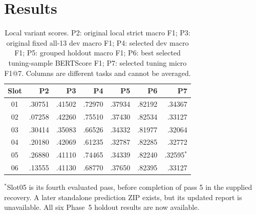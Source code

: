 \section{Results}\label{sec:results}
\begin{table}[H]
\centering\small
\caption{Local variant scores. P2: original local strict macro F1; P3: original fixed all-13 dev macro F1; P4: selected dev macro F1; P5: grouped holdout macro F1; P6: best selected tuning-sample BERTScore F1; P7: selected tuning micro F1@7. Columns are different tasks and cannot be averaged.}
\label{tab:variants}
\begin{tabular}{crrrrrr}
\toprule
Slot & P2 & P3 & P4 & P5 & P6 & P7\\
\midrule
01 & .30751 & .41502 & .72970 & .37934 & .82192 & .34367\\
02 & .07258 & .42260 & .75510 & .37430 & .82534 & .33127\\
03 & .30414 & .35083 & .66526 & .34332 & .81977 & .32064\\
04 & .20180 & .42069 & .61235 & .32787 & .82285 & .32772\\
05 & .26880 & .41110 & .74465 & .34339 & .82240 & .32595$^{*}$\\
06 & .13555 & .41130 & .68770 & .37650 & .82395 & .33127\\
\bottomrule
\end{tabular}
\end{table}
\noindent\small $^{*}$Slot05 is its fourth evaluated pass, before completion of pass 5 in the supplied recovery. A later standalone prediction ZIP exists, but its updated report is unavailable. All six Phase~5 holdout results are now available.\normalsize

